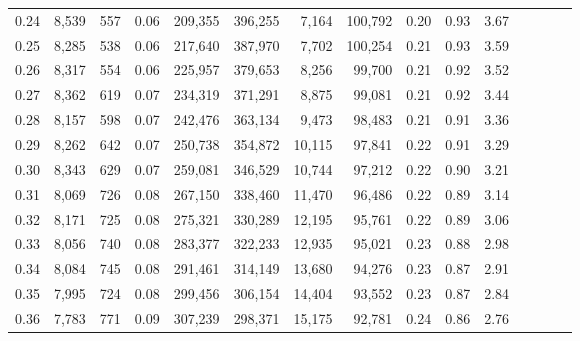 \begin{tabular}{rrrcrrrrrrrrrrr}
0.24 &   8,539 &    557 &                                       0.06 &  209,355 &  396,255 &    7,164 &  100,792 &  0.20 &  0.93 &                         3.67 \\
0.25 &   8,285 &    538 &                                       0.06 &  217,640 &  387,970 &    7,702 &  100,254 &  0.21 &  0.93 &                         3.59 \\
0.26 &   8,317 &    554 &                                       0.06 &  225,957 &  379,653 &    8,256 &   99,700 &  0.21 &  0.92 &                         3.52 \\
0.27 &   8,362 &    619 &                                       0.07 &  234,319 &  371,291 &    8,875 &   99,081 &  0.21 &  0.92 &                         3.44 \\
0.28 &   8,157 &    598 &                                       0.07 &  242,476 &  363,134 &    9,473 &   98,483 &  0.21 &  0.91 &                         3.36 \\
0.29 &   8,262 &    642 &                                       0.07 &  250,738 &  354,872 &   10,115 &   97,841 &  0.22 &  0.91 &                         3.29 \\
0.30 &   8,343 &    629 &                                       0.07 &  259,081 &  346,529 &   10,744 &   97,212 &  0.22 &  0.90 &                         3.21 \\
0.31 &   8,069 &    726 &                                       0.08 &  267,150 &  338,460 &   11,470 &   96,486 &  0.22 &  0.89 &                         3.14 \\
0.32 &   8,171 &    725 &                                       0.08 &  275,321 &  330,289 &   12,195 &   95,761 &  0.22 &  0.89 &                         3.06 \\
0.33 &   8,056 &    740 &                                       0.08 &  283,377 &  322,233 &   12,935 &   95,021 &  0.23 &  0.88 &                         2.98 \\
0.34 &   8,084 &    745 &                                       0.08 &  291,461 &  314,149 &   13,680 &   94,276 &  0.23 &  0.87 &                         2.91 \\
0.35 &   7,995 &    724 &                                       0.08 &  299,456 &  306,154 &   14,404 &   93,552 &  0.23 &  0.87 &                         2.84 \\
0.36 &   7,783 &    771 &                                       0.09 &  307,239 &  298,371 &   15,175 &   92,781 &  0.24 &  0.86 &                         2.76 \\

\end{tabular}
